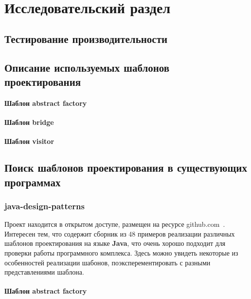 \chapter{Исследовательский раздел}
\label{cha:research}

\section{Тестирование производительности}

\section{Описание используемых шаблонов проектирования}

\subsubsection{Шаблон abstract factory}

\subsubsection{Шаблон bridge}

\subsubsection{Шаблон visitor}

\section{Поиск шаблонов проектирования в существующих программах}

\subsection{java-design-patterns}

Проект находится в открытом доступе, размещен на ресурсе
github.com~\cite{java-design-patterns}.
Интересен тем, что содержит сборник из 48 примеров реализации различных
шаблонов проектирования на языке \textbf{Java},
что очень хорошо подходит для проверки работы программного комплекса.
Здесь можно увидеть некоторые из особенностей реализации шабонов,
поэксперементировать с разными представлениями шаблона.

\subsubsection{Шаблон abstract factory}

